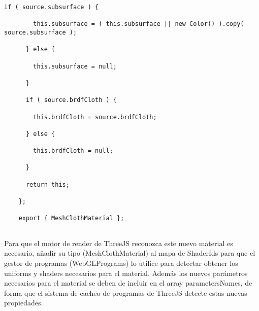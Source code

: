 \begin{lstlisting}[caption=Clase MeshClothMaterial]
      if ( source.subsurface ) {
    
        this.subsurface = ( this.subsurface || new Color() ).copy( source.subsurface );
    
      } else {
    
        this.subsurface = null;
    
      }
    
      if ( source.brdfCloth ) {
    
        this.brdfCloth = source.brdfCloth;
    
      } else {
    
        this.brdfCloth = null;
    
      }
    
      return this;
    
    };
    
    export { MeshClothMaterial };
    
  \end{lstlisting}
  
  Para que el motor de render de ThreeJS reconozca este nuevo material es necesario, a\~nadir
  su tipo (MeshClothMaterial) al mapa de ShaderIds para que el gestor de programas (WebGLPrograms)
  lo utilice para detectar obtener los uniforms y shaders necesarios para el material. Adem\'as
  los nuevos par\'ametros necesarios para el material se deben de incluir en el array
  parametersNames, de forma que el sistema de cacheo de programas de ThreeJS detecte estas
  nuevas propiedades.\newline
  
